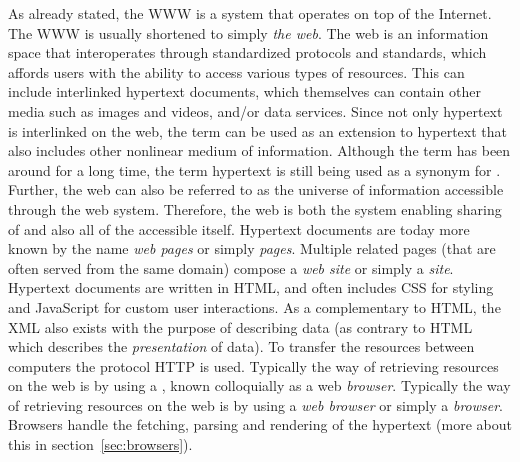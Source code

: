   As already stated, the \gls{WWW} is a system that operates on top of the Internet.
  The \gls{WWW} is usually shortened to simply \emph{the \gls{web}}.
  The \gls{web} is an information space that interoperates through standardized protocols and standards, which affords users with the ability to access various types of resources.
  This can include interlinked \gls{hypertext} \glspl{document}, which themselves can contain other media such as images and videos, and/or data services.
  Since not only \gls{hypertext} is interlinked on the \gls{web}, the term \emph{} can be used as an extension to \gls{hypertext} that also includes other nonlinear medium of information.
  Although the term  has been around for a long time, the term \gls{hypertext} is still being used as a synonym for .
  Further, the \gls{web} can also be referred to as the universe of information accessible through the \gls{web} system.
  Therefore, the \gls{web} is both the system enabling sharing of  and also all of the accessible  itself.
  Hypertext \glspl{document} are today more known by the name \emph{\gls{web} pages} or simply \emph{pages}.
  Multiple related pages (that are often served from the same domain) compose a \emph{web site} or simply a \emph{site}.
  Hypertext \glspl{document} are written in \gls{HTML}, and often includes \gls{CSS} for styling and \gls{JavaScript} for custom user interactions.
  As a complementary to \gls{HTML}, the \gls{XML} also exists with the purpose of describing data (as contrary to \gls{HTML} which describes the \emph{presentation} of data).
  To transfer the resources between computers the protocol \gls{HTTP} is used.
  Typically the way of retrieving resources on the web is by using a \emph{}, known colloquially as a \gls{web} \emph{\gls{browser}}.
  Typically the way of retrieving resources on the \gls{web} is by using a \emph{\gls{web} \gls{browser}} or simply a \emph{\gls{browser}}.
  Browsers handle the fetching, parsing and rendering of the \gls{hypertext} (more about this in section~\ref{sec:browsers}).
  

